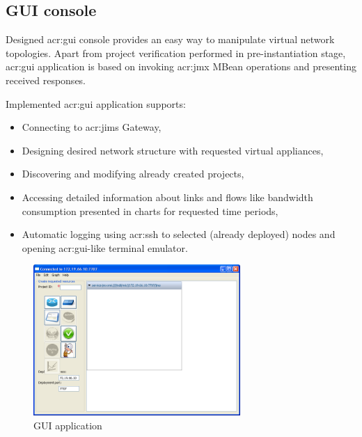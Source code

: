 \documentclass[11pt,openany]{book}
\begin{document}
        \begin{figure}[H]

          \caption{}
          \label{fig:impl:integration}
        \end{figure}


      \subsection{GUI console}
      \label{ssec:impl:gui}
		
        Designed \gls{acr:gui} console provides an easy way to manipulate virtual network topologies. Apart from project
        verification performed in pre-instantiation stage, \gls{acr:gui} application is based on invoking \gls{acr:jmx}
        MBean operations and presenting received responses.

        Implemented \gls{acr:gui} application supports:

        \begin{itemize}
          \item Connecting to \gls{acr:jims} Gateway,
          \item Designing desired network structure with requested virtual appliances,
          \item Discovering and modifying already created projects,
          \item Accessing detailed information about links and flows like bandwidth consumption presented in charts for
                requested time periods,
          \item Automatic logging using \gls{acr:ssh} to selected (already deployed) nodes and opening
                \gls{acr:gui}-like terminal emulator.
        \end{itemize}

        \begin{figure}[H]
          \centering
          \includegraphics[width=0.7\textwidth]{img/impl/gui.png}

          \caption{GUI application}
        \end{figure}
\end{document}
